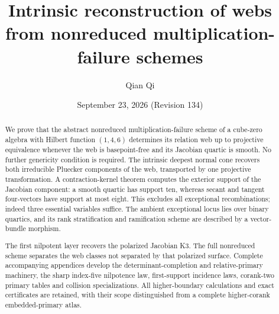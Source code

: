 \title[Intrinsic reconstruction of webs]{Intrinsic reconstruction of webs from nonreduced multiplication-failure schemes}
\author{Qian Qi}
\date{September 23, 2026 \quad (Revision 134)}
\begin{abstract}
We prove that the abstract nonreduced multiplication-failure scheme
of a cube-zero algebra with Hilbert function \((1,4,6)\) determines
its relation web up to projective equivalence whenever the web is
basepoint-free and its Jacobian quartic is smooth.  No further
genericity condition is required.  The intrinsic deepest normal cone
recovers both irreducible Pluecker components of the web, transported
by one projective transformation.  A contraction-kernel theorem
computes the exterior support of the Jacobian component: a smooth
quartic has support ten, whereas secant and tangent four-vectors have
support at most eight.  This excludes all exceptional recombinations;
indeed three essential variables suffice.  The ambient exceptional
locus lies over binary quartics, and its rank stratification and
ramification scheme are described by a vector-bundle morphism.

The first nilpotent layer recovers the polarized Jacobian K3.  The
full nonreduced scheme separates the web classes not separated by
that polarized surface.  Complete accompanying appendices develop
the determinant-completion and relative-primary machinery, the sharp
index-five nilpotence law, first-support incidence laws, corank-two
primary tables and collision specializations.  All higher-boundary
calculations and exact certificates are retained, with their scope
distinguished from a complete higher-corank embedded-primary atlas.
\end{abstract}
\maketitle
